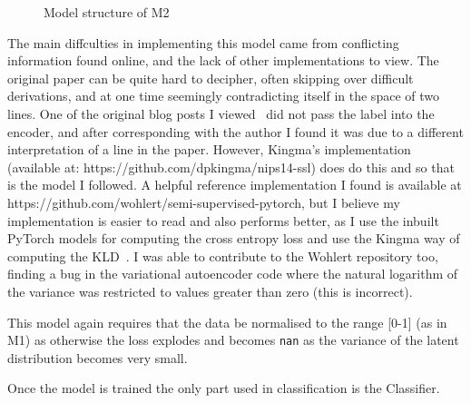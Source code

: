 \documentclass[12pt,a4paper,twoside,openright]{report}
\begin{document}
\begin{figure}[H]
  \centering
  \caption{Model structure of M2}
\end{figure}

The main diffculties in implementing this model came from conflicting information found online, and the lack of other implementations to view. 
The original paper can be quite hard to decipher, often skipping over difficult derivations, and at one time seemingly contradicting 
itself in the space of two lines. One of the original blog posts I viewed~\cite{Semisupe95:online} did not pass the label into the 
encoder, and after corresponding with the author I found it was due to a different interpretation of a line in the paper. However,
Kingma's implementation (available at: https://github.com/dpkingma/nips14-ssl) does do this and so that is the model I followed. A 
helpful reference implementation I found is available at https://github.com/wohlert/semi-supervised-pytorch, but I believe my implementation is 
easier to read and also performs better, as I use the inbuilt PyTorch models for computing the cross entropy loss and use the Kingma way 
of computing the KLD~\cite{DBLP:journals/corr/KingmaW13}. I was able to contribute to the Wohlert repository too, finding a bug in the 
variational autoencoder code where the natural logarithm of the variance was restricted to values greater than zero (this is incorrect).

This model again requires that the data be normalised to the range [0-1] (as in M1) as otherwise the loss explodes and becomes 
\texttt{nan} as the variance of the latent distribution becomes very small.

Once the model is trained the only part used in classification is the Classifier.
\end{document}
